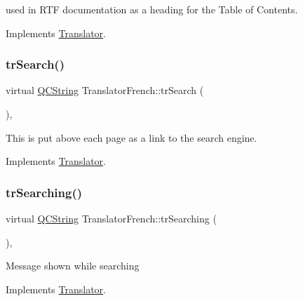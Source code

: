 used in R\+TF documentation as a heading for the Table of Contents. 

Implements \mbox{\hyperlink{class_translator}{Translator}}.

\mbox{\label{class_translator_french_ab0dd22cc40f0f5ca9b85360046e26ddb}} 
\subsubsection{\texorpdfstring{trSearch()}{trSearch()}}
{\footnotesize\ttfamily virtual \mbox{\hyperlink{class_q_c_string}{Q\+C\+String}} Translator\+French\+::tr\+Search (\begin{DoxyParamCaption}{ }\end{DoxyParamCaption})\hspace{0.3cm}{\ttfamily [inline]}, {\ttfamily [virtual]}}

This is put above each page as a link to the search engine. 

Implements \mbox{\hyperlink{class_translator}{Translator}}.

\mbox{\label{class_translator_french_a90f43b00cbba3903b0067dbca2eb0165}} 
\subsubsection{\texorpdfstring{trSearching()}{trSearching()}}
{\footnotesize\ttfamily virtual \mbox{\hyperlink{class_q_c_string}{Q\+C\+String}} Translator\+French\+::tr\+Searching (\begin{DoxyParamCaption}{ }\end{DoxyParamCaption})\hspace{0.3cm}{\ttfamily [inline]}, {\ttfamily [virtual]}}

Message shown while searching 

Implements \mbox{\hyperlink{class_translator}{Translator}}.

\mbox{\label{class_translator_french_a8a4b974de1ce2aee156f408f7b20fceb}} 
